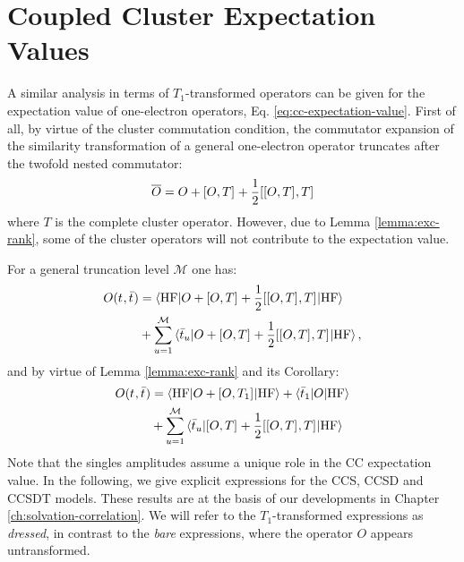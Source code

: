 \section{Coupled Cluster Expectation Values}\label{sec:CC-expval}

A similar analysis in terms of $T_1$-transformed operators can be given for the
expectation value of one-electron operators, Eq.
\eqref{eq:cc-expectation-value}.
First of all, by virtue of the cluster commutation
condition,\autocite{Helgaker2000-tz} the commutator expansion of the similarity
transformation of a general one-electron operator truncates after the twofold
nested commutator:
\begin{equation}
\overline{O} = O
  + [ O, T ]^{}
  + \frac{1}{2}[ [ O, T ]^{}, T ]^{}
\end{equation}
where $T$ is the complete cluster operator. However, due to Lemma
\ref{lemma:exc-rank}, some of the cluster operators will not contribute to the
expectation value.

For a general truncation level $\mathcal{M}$ one has:
\begin{equation}
  \begin{aligned}
  O(t_{}, \bar{t}_{}) &=
  \braket{\mathrm{HF} | O + [ O, T ]^{} + \frac{1}{2}[ [ O, T ]^{}, T ]^{} | \mathrm{HF}} \\
  &+ \sum_{u=1}^{\mathcal{M}}\braket{\bar{t}_{u} | O + [ O, T ]^{} +
  \frac{1}{2}[ [ O, T ]^{}, T ]^{} | \mathrm{HF}},
  \end{aligned}
\end{equation}
and by virtue of Lemma \ref{lemma:exc-rank} and its Corollary:
\begin{equation}
\begin{aligned}
  O(t_{}, \bar{t}_{})
  &=
  \braket{\mathrm{HF} | O + [ O, T_1 ]^{} | \mathrm{HF}}
  + \braket{\bar{t}_{1} | O | \mathrm{HF}} \\
  &+ \sum_{u=1}^{\mathcal{M}}\braket{\bar{t}_{u} | [ O, T ]^{} + \frac{1}{2}[ [ O, T ]^{}, T ]^{} | \mathrm{HF}}
\end{aligned}
\end{equation}
Note that the singles amplitudes assume a unique role in the \acrshort{CC}
expectation value.
In the following, we give explicit expressions for the \acrshort{CCS}, \acrshort{CCSD}
and \acrshort{CCSDT} models. These results are at the basis of our developments
in Chapter \ref{ch:solvation-correlation}.
We will refer to the $T_1$-transformed expressions as \emph{dressed}, in contrast to the
\emph{bare} expressions, where the operator $O$ appears untransformed.

